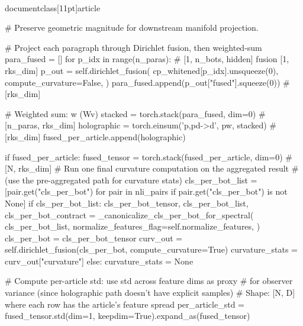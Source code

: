 \\documentclass[11pt]{article}
\begin{document}
\begin{CodeBlock}
                    # Preserve geometric magnitude for downstream manifold projection.

                    # Project each paragraph through Dirichlet fusion, then weighted-sum
                    para_fused = []
                    for p_idx in range(n_paras):
                        # [1, n_bots, hidden]  fusion  [1, rks_dim]
                        p_out = self.dirichlet_fusion(
                            cp_whitened[p_idx].unsqueeze(0),
                            compute_curvature=False,
                        )
                        para_fused.append(p_out["fused"].squeeze(0))  # [rks_dim]

                    # Weighted sum:  w  (Wv)
                    stacked = torch.stack(para_fused, dim=0)  # [n_paras, rks_dim]
                    holographic = torch.einsum('p,pd->d', pw, stacked)  # [rks_dim]
                    fused_per_article.append(holographic)

                if fused_per_article:
                    fused_tensor = torch.stack(fused_per_article, dim=0)  # [N, rks_dim]
                    # Run one final curvature computation on the aggregated result
                    # (use the pre-aggregated path for curvature stats)
                    cls_per_bot_list = [pair.get("cls_per_bot") for pair in nli_pairs if pair.get("cls_per_bot") is not None]
                    if cls_per_bot_list:
                        cls_per_bot_tensor, cls_per_bot_list, cls_per_bot_contract = _canonicalize_cls_per_bot_for_spectral(
                            cls_per_bot_list,
                            normalize_features_flag=self.normalize_features,
                        )
                        cls_per_bot = cls_per_bot_tensor
                        curv_out = self.dirichlet_fusion(cls_per_bot, compute_curvature=True)
                        curvature_stats = curv_out["curvature"]
                    else:
                        curvature_stats = None

                    # Compute per-article std: use std across feature dims as proxy
                    # for observer variance (since holographic path doesn't have explicit samples)
                    # Shape: [N, D] where each row has the article's feature spread
                    per_article_std = fused_tensor.std(dim=1, keepdim=True).expand_as(fused_tensor)


\end{CodeBlock}
\end{document}
